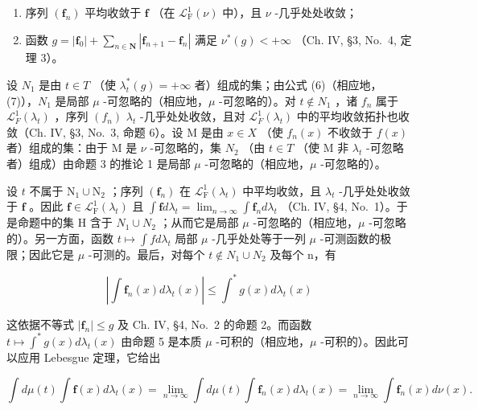 \begin{enumerate}
\def\labelenumi{\arabic{enumi})}
\item
  序列 \((\mathbf{f}_n)\) 平均收敛于 \(\mathbf{f}\) （在 \(\mathcal{L}_{\mathrm{F}}^{1}(\nu)\) 中），且 \(\nu\) -几乎处处收敛；
\item
  函数 \(g = |\mathbf{f}_0| + \sum_{n\in \mathbf{N}}|\mathbf{f}_{n + 1} - \mathbf{f}_n|\) 满足 \(\nu^{*}(g) < +\infty\) （Ch. IV, §3, No.~4, 定理 3）。
\end{enumerate}

设 \(N_{1}\) 是由 \(t \in T\) （使 \(\lambda_{t}^{*}(g) = +\infty\) 者）组成的集；由公式 (6)（相应地，(7)），\(N_{1}\) 是局部 \(\mu\) -可忽略的（相应地，\(\mu\) -可忽略的）。对 \(t \notin N_{1}\) ，诸 \(f_{n}\) 属于 \(\mathcal{L}_{F}^{1}(\lambda_{t})\) ，序列 \((f_{n})\) \(\lambda_{t}\) -几乎处处收敛，且对 \(\mathcal{L}_{F}^{1}(\lambda_{t})\) 中的平均收敛拓扑也收敛（Ch. IV, §3, No.~3, 命题 6）。设 M 是由 \(x \in X\) （使 \(f_{n}(x)\) 不收敛于 \(f(x)\) 者）组成的集：由于 M 是 \(\nu\) -可忽略的，集 \(N_{2}\) （由 \(t \in T\) （使 M 非 \(\lambda_{t}\) -可忽略者）组成）由命题 3 的推论 1 是局部 \(\mu\) -可忽略的（相应地，\(\mu\) -可忽略的）。

设 \(t\) 不属于 \(\mathrm{N}_1 \cup \mathrm{N}_2\) ；序列 \((\mathbf{f}_n)\) 在 \(\mathcal{L}_{\mathrm{F}}^{1}(\lambda_t)\) 中平均收敛，且 \(\lambda_t\) -几乎处处收敛于 \(\mathbf{f}\) 。因此 \(\mathbf{f} \in \mathcal{L}_{\mathrm{F}}^{1}(\lambda_t)\) 且 \(\int \mathbf{f} d\lambda_t = \lim_{n \to \infty} \int \mathbf{f}_n d\lambda_t\) （Ch. IV, §4, No.~1）。于是命题中的集 H 含于 \(N_{1} \cup N_{2}\) ；从而它是局部 \(\mu\) -可忽略的（相应地，\(\mu\) -可忽略的）。另一方面，函数 \(t \mapsto \int f d\lambda_{t}\) 局部 \(\mu\) -几乎处处等于一列 \(\mu\) -可测函数的极限；因此它是 \(\mu\) -可测的。最后，对每个 \(t \notin N_{1} \cup N_{2}\) 及每个 n，有

\[
\left| \int \mathbf {f} _ {n} (x) d \lambda_ {t} (x) \right| \leqslant \int^ {*} g (x) d \lambda_ {t} (x)
\]

这依据不等式 \(|\mathbf{f}_n| \leqslant g\) 及 Ch. IV, §4, No.~2 的命题 2。而函数 \(t \mapsto \int^{*} g(x) d\lambda_t(x)\) 由命题 5 是本质 \(\mu\) -可积的（相应地，\(\mu\) -可积的）。因此可以应用 Lebesgue 定理，它给出

\[
\int d \mu (t) \int \mathbf {f} (x) d \lambda_ {t} (x) = \lim _ {n \rightarrow \infty} \int d \mu (t) \int \mathbf {f} _ {n} (x) d \lambda_ {t} (x) = \lim _ {n \rightarrow \infty} \int \mathbf {f} _ {n} (x) d \nu (x).
\]

